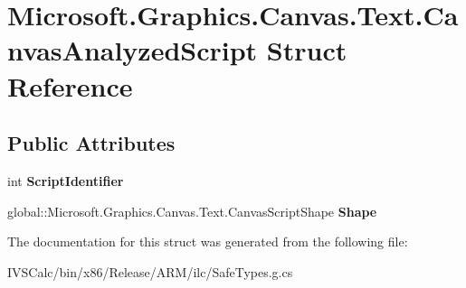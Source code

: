 \hypertarget{struct_microsoft_1_1_graphics_1_1_canvas_1_1_text_1_1_canvas_analyzed_script}{}\section{Microsoft.\+Graphics.\+Canvas.\+Text.\+Canvas\+Analyzed\+Script Struct Reference}
\label{struct_microsoft_1_1_graphics_1_1_canvas_1_1_text_1_1_canvas_analyzed_script}
\subsection*{Public Attributes}
\begin{DoxyCompactItemize}
\item 
\mbox{\label{struct_microsoft_1_1_graphics_1_1_canvas_1_1_text_1_1_canvas_analyzed_script_a0d74c522b72105d47ac5f92390526223}} 
int {\bfseries Script\+Identifier}
\item 
\mbox{\label{struct_microsoft_1_1_graphics_1_1_canvas_1_1_text_1_1_canvas_analyzed_script_a5dacac82525fd6cd5722f96d197d2d0e}} 
global\+::\+Microsoft.\+Graphics.\+Canvas.\+Text.\+Canvas\+Script\+Shape {\bfseries Shape}
\end{DoxyCompactItemize}


The documentation for this struct was generated from the following file\+:\begin{DoxyCompactItemize}
\item 
I\+V\+S\+Calc/bin/x86/\+Release/\+A\+R\+M/ilc/Safe\+Types.\+g.\+cs\end{DoxyCompactItemize}
